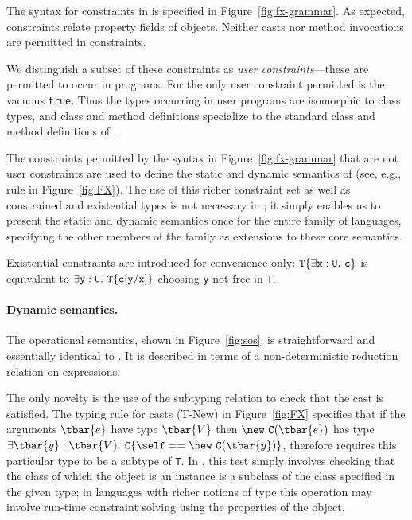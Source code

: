 The syntax for constraints in \FXZ{} is specified in
Figure~\ref{fig:fx-grammar}. As expected, constraints
relate property fields of objects. Neither casts
nor method invocations are permitted in constraints.

We distinguish a subset of these constraints as
{\em user constraints}---these are permitted to occur in
programs. For \FXZ{} the only user constraint permitted is the vacuous
{\tt true}. Thus the types occurring in user programs are isomorphic
to class types, and class and method definitions specialize to the
standard class and method definitions of \FJ{}. 

The constraints permitted by the syntax in
Figure~\ref{fig:fx-grammar} that
are not user constraints are used to define the static and
dynamic semantics of \FXZ{} (see, e.g., rule \TField{} in Figure~\ref{fig:FX}).
The use of this richer constraint set as well as constrained and existential types is
not necessary in \FXZ; it simply enables us to present the static and dynamic
semantics once for the entire family of \FX{} languages,
specifying the other members of the family as extensions
to these core semantics.

Existential constraints are introduced for convenience only:
${\tt T}\{\exists {\tt x}:{\tt U}.~{\tt c}\}$ is equivalent to $\exists {\tt y}:{\tt U}.~{\tt T}\{{\tt c}[{\tt y}/{\tt x}]\}$ choosing {\tt y} not free in {\tt T}.

\paragraph{Dynamic semantics.}
The operational semantics, shown in Figure~\ref{fig:sos},
is straightforward and essentially identical
to \FJ \cite{FJ}. It is described in terms of a non-deterministic
reduction relation on expressions.

The only novelty is the use of the
subtyping relation to check that the cast is satisfied.
The typing rule for casts ({\sc T-New}) in Figure~\ref{fig:FX} specifies that if the arguments $\tbar{e}$ have type $\tbar{V}$ then $\new~{\tt C}(\tbar{e})$ has type $\exists\tbar{y}:\tbar{V}.~{\tt C}\{\self==\new~{\tt C}(\tbar{y})\}$, therefore {\RCast} requires this particular type to be a subtype of {\tt T}.
In \FXZ, this
test simply involves checking that the class of which the object is an
instance is a subclass of the class specified in the given type; in
languages with richer notions of type this operation may
involve run-time constraint solving using the properties of the object.

